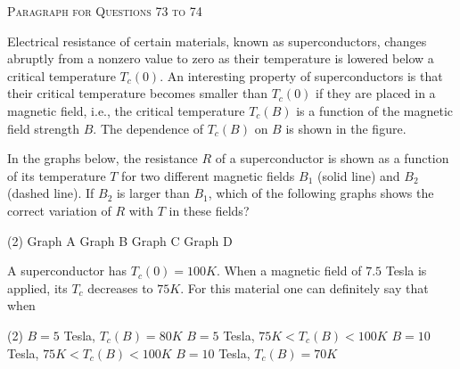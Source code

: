 
\begin{center}
    \textsc{Paragraph for Questions 73 to 74}
\end{center}

Electrical resistance of certain materials, known as superconductors, changes abruptly from a nonzero value to zero as their temperature is lowered below a critical temperature \(T_c(0)\). An interesting property of superconductors is that their critical temperature becomes smaller than \(T_c (0)\) if they are placed in a magnetic field, i.e., the critical temperature \(T_c (B)\) is a function of the magnetic field strength \(B\). The dependence of \(T_c (B)\) on \(B\) is shown in the figure.

\begin{center}
\end{center} 

\item In the graphs below, the resistance \(R\) of a superconductor is shown as a function of its temperature \(T\) for two different magnetic fields \(B_1\) (solid line) and \(B_2\) (dashed line). If \(B_2\) is larger than \(B_1\), which of the following graphs shows the correct variation of \(R\) with \(T\) in these fields?
    \begin{tasks}(2)
        \task Graph A
        \task Graph B
        \task Graph C
        \task Graph D
    \end{tasks}

\item A superconductor has \( T_c (0) = 100 K\). When a magnetic field of \(7.5\) Tesla is applied, its \(T_c\) decreases to \(75 K\). For this material one can definitely say that when
    \begin{tasks}(2)
        \task \(B = 5\) Tesla, \( T_c (B) = 80 K\)
        \task \(B = 5\) Tesla, \(75 K < T_c (B) < 100 K\)
        \task \(B = 10\) Tesla, \(75 K < T_c (B) < 100 K\)
        \task \(B = 10\) Tesla, \(T_c (B) = 70 K\)
    \end{tasks} 
